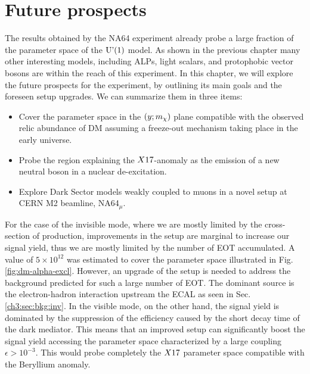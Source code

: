 
\newcommand{\pdirfive}{chapters/plots/chapter5}

\chapter{Future prospects}
\label{chapter5}

The results obtained by the NA64 experiment already probe a large fraction of the parameter space of the $\textrm{U'(1)}$ model. As shown in the previous chapter many other interesting models, including ALPs, light scalars, and protophobic vector bosons are within the reach of this experiment. In this chapter, we will explore the future prospects for the experiment, by outlining its main goals and the foreseen setup upgrades. We can summarize them in three items:

\begin{itemize}
\item Cover the parameter space in the $(y;m_{\chi})$ plane compatible with the observed relic abundance of DM assuming a freeze-out mechanism taking place in the early universe.
\item Probe the region explaining the $X17$-anomaly as the emission of a new neutral boson in a nuclear de-excitation.
\item Explore Dark Sector models weakly coupled to muons in a novel setup at CERN M2 beamline, NA64$_{\mu}$.
\end{itemize}

For the case of the invisible mode, where we are mostly limited by the cross-section of production, improvements in the setup are marginal to increase our signal yield, thus we are mostly limited by the number of EOT accumulated. 
A value of $5 \times 10^{12}$ was estimated to cover the parameter space illustrated in Fig.\ref{fig:dm-alpha-excl}. However, an upgrade of the setup is needed to address the background predicted for such a large number of EOT. The dominant source is the electron-hadron interaction upstream the ECAL as seen in Sec.\ref{ch3:sec:bkg:inv}.
In the visible mode, on the other hand, the signal yield is dominated by the suppression of the efficiency caused by the short decay time of the dark mediator. This means that an improved setup can significantly boost the signal yield accessing the parameter space characterized by a large coupling $\epsilon > 10^{-3}$. This would probe completely the $X17$ parameter space compatible with the Beryllium anomaly.


